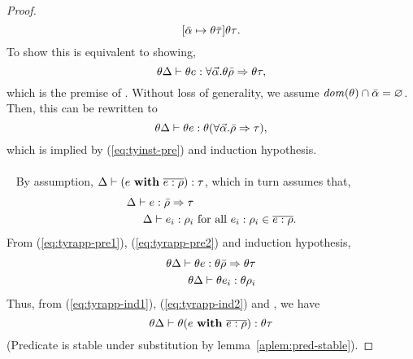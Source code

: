 \begin{proof}
\begin{equation*}
{      [\bar{\alpha} \mapsto \theta \bar{\tau}] \theta \tau}.
  \end{equation*}
  To show this is equivalent to showing,
  \begin{equation*}
    \theta \Delta \vdash 
    \theta e:\forall \vec{\alpha}. \theta \bar{\rho} \Rightarrow \theta \tau,
  \end{equation*}
  which is the premise of \TyInst.
  Without loss of generality, we assume ${\it dom }(\theta) \cap
  \bar{\alpha} = \varnothing$. Then, this can be rewritten to
  \begin{equation*}
    \theta \Delta \vdash 
    \theta e:\theta (\forall \vec{\alpha}. \bar{\rho} \Rightarrow \tau),
  \end{equation*}
  which is implied by (\ref{eq:tyinst-pre}) and induction hypothesis.
  \\
  \\
  \case \TyRApp~ By assumption, $\Delta \vdash
  (e {\bf ~with~} \overline{e:\rho}):\tau$, which in turn assumes
  that,
  \begin{eqnarray}
    \label{eq:tyrapp-pre1}
    \Delta \vdash e:\bar{\rho} \Rightarrow \tau & \\
    \label{eq:tyrapp-pre2}
    \Delta \vdash e_i:\rho_i & \text{~for all~}
    e_i:\rho_i \in \overline{e:\rho}.
  \end{eqnarray}
  \noindent
  From (\ref{eq:tyrapp-pre1}), (\ref{eq:tyrapp-pre2}) and induction
  hypothesis, 
  \begin{eqnarray}
    \label{eq:tyrapp-ind1}
    \theta \Delta \vdash 
    \theta e:\theta \bar{\rho} \Rightarrow \theta \tau \\
    \label{eq:tyrapp-ind2}
    \theta \Delta \vdash \theta e_i:\theta \rho_i
  \end{eqnarray}
  \noindent
  Thus, from (\ref{eq:tyrapp-ind1}), (\ref{eq:tyrapp-ind2}) and
  \TyRApp, we have
  \begin{equation*}
    \theta \Delta \vdash
    \theta (e {\bf ~with~} \overline{e:\rho}):\theta \tau
  \end{equation*}
  (Predicate \distinctwith{} is stable under substitution by
  lemma~\ref{aplem:pred-stable}).
\end{proof}



